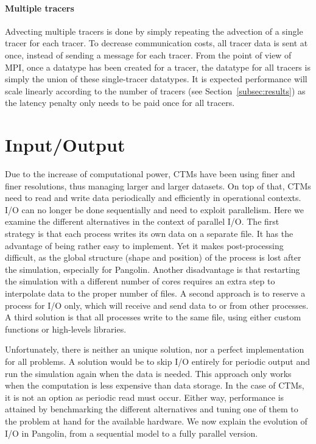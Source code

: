 \paragraph{Multiple tracers}
Advecting multiple tracers is done by simply repeating the advection of a single
tracer for each tracer. To decrease communication costs, all tracer data is sent at once, instead of sending a message for each tracer. From the
point of view of MPI, once a datatype has been created for a tracer, the
datatype for all tracers is simply the union of these single-tracer datatypes.
It is expected performance will scale linearly according to the number of tracers (see
Section~\ref{subsec:results}) as the latency penalty only needs to be paid once
for all tracers.

\section{Input/Output}
Due to the increase of computational power, CTMs have been using finer and finer
resolutions, thus managing larger and larger datasets. On top of that, CTMs need
to read and write data periodically and efficiently in operational contexts. I/O
can no longer be done sequentially and need to exploit parallelism. Here we
examine the different alternatives in the context of parallel I/O.  The first
strategy is that each process writes its own data on a separate file. It has the
advantage of being rather easy to implement. Yet it makes post-processing
difficult, as the global structure (shape and position) of the process is lost
after the simulation, especially for Pangolin. Another disadvantage is that
restarting the simulation with a different number of cores requires an extra step
to interpolate data to the proper number of files. A second approach is to
reserve a process for I/O only, which will receive and send data to or from
other processes. A third solution is that all processes write to the same file,
using either custom functions or high-levels libraries. 

Unfortunately, there is neither an unique solution, nor a perfect implementation
for all problems. A solution would be to skip I/O entirely for periodic output
and run the simulation again when the data is needed. This approach only works
when the computation is less expensive than data storage. In the case of CTMs,
it is not an option as periodic read must occur. Either way, performance is
attained by benchmarking the different alternatives and tuning one of them to
the problem at hand for the available hardware. We now explain the evolution of
I/O in Pangolin, from a sequential model to a fully parallel version.

